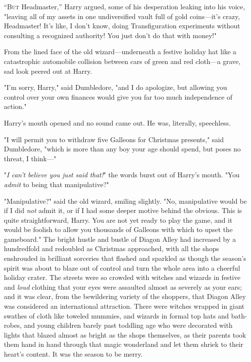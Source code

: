 
\lettrine{“B}{ut} Headmaster,''
Harry argued, some of his desperation leaking into his voice, "leaving all of
my assets in one undiversified vault full of gold coins---it's crazy,
Headmaster! It's like, I don't know, doing Transfiguration experiments without
consulting a recognized authority! You just don't do that with money!"

From the lined face of the old wizard---underneath a festive holiday hat like a
catastrophic automobile collision between cars of green and red cloth---a
grave, sad look peered out at Harry.

"I'm sorry, Harry," said Dumbledore, "and I do apologize, but allowing you
control over your own finances would give you far too much independence of
action."

Harry's mouth opened and no sound came out. He was, literally, speechless.

"I will permit you to withdraw five Galleons for Christmas presents," said
Dumbledore, "which is more than any boy your age should spend, but poses no
threat, I think---"

"\emph{I can't believe you just said that!}" the words burst out of Harry's
mouth. "You \emph{admit} to being that manipulative?"

"Manipulative?" said the old wizard, smiling slightly. "No, manipulative would
be if I did \emph{not} admit it, or if I had some deeper motive behind the
obvious. This is quite straightforward, Harry. You are not yet ready to play
the game, and it would be foolish to allow you thousands of Galleons with which
to upset the gameboard."
\sbreak
The bright hustle and bustle of Diagon Alley had increased by a hundredfold and
redoubled as Christmas approached, with all the shops enshrouded in brilliant
sorceries that flashed and sparkled as though the season's spirit was about to
blaze out of control and turn the whole area into a cheerful holiday crater.
The streets were so crowded with witches and wizards in festive and \emph{loud}
clothing that your eyes were assaulted almost as severely as your ears; and it
was clear, from the bewildering variety of the shoppers, that Diagon Alley was
considered an international attraction. There were witches wrapped in giant
swathes of cloth like toweled mummies, and wizards in formal top hats and
bath-robes, and young children barely past toddling age who were decorated with
lights that blazed almost as bright as the shops themselves, as their parents
took them hand in hand through that magic wonderland and let them shriek to
their heart's content. It was the season to be merry.

